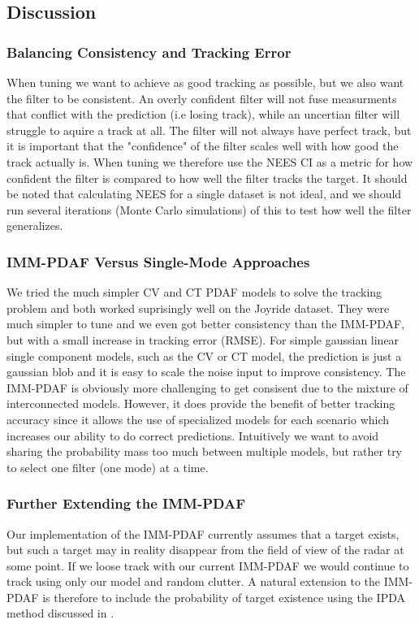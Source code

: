 \subsection{Discussion}
\subsubsection{Balancing Consistency and Tracking Error}
When tuning we want to achieve as good tracking as possible, but we also want the filter to be consistent. An overly confident filter will not fuse measurments that conflict with the prediction (i.e losing track), while an uncertian filter will struggle to aquire a track at all. The filter will not always have perfect track, but it is important that the "confidence" of the filter scales well with how good the track actually is.
When tuning we therefore use the NEES CI as a metric for how confident the filter is compared to how well the filter tracks the target. It should be noted that calculating NEES for a single dataset is not ideal, and we should run several iterations (Monte Carlo simulations) of this to test how well the filter generalizes.

\subsubsection{IMM-PDAF Versus Single-Mode Approaches} \label{whyimmpdaf}
We tried the much simpler CV and CT PDAF models to solve the tracking problem and both worked suprisingly well on the Joyride dataset. They were much simpler to tune and we even got better consistency than the IMM-PDAF, but with a small increase in tracking error (RMSE). For simple gaussian linear single component models, such as the CV or CT model, the prediction is just a gaussian blob and it is easy to scale the noise input to improve consistency. The IMM-PDAF is obviously more challenging to get consisent due to the mixture of interconnected models. However, it does provide the benefit of better tracking accuracy since it allows the use of specialized models for each scenario which increases our ability to do correct predictions. Intuitively we want to avoid sharing the probability mass too much between multiple models, but rather try to select one filter (one mode) at a time.

\subsubsection{Further Extending the IMM-PDAF}
Our implementation of the IMM-PDAF currently assumes that a target exists, but such a target may in reality disappear from the field of view of the radar at some point. If we loose track with our current IMM-PDAF we would continue to track using only our model and random clutter. A natural extension to the IMM-PDAF is therefore to include the probability of target existence using the IPDA method discussed in \cite{imm-ipda}.
